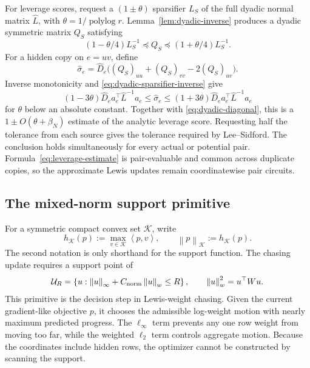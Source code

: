 \documentclass[11pt]{article}
\theoremstyle{definition}
\newcommand{\polylog}{\operatorname{polylog}}
\newcommand{\norm}[1]{\left\lVert #1\right\rVert}
\newcommand{\set}[1]{\left\{#1\right\}}
\newcommand{\ip}[2]{\left\langle #1,#2\right\rangle}
\newcommand{\defeq}{\mathrel{:=}}
\begin{document}
For leverage scores, request a $(1\pm\theta)$ sparsifier $L_S$ of the full
dyadic normal matrix $\widehat L$, with
$\theta=1/\polylog r$.  Lemma~\ref{lem:dyadic-inverse} produces a
dyadic symmetric matrix $Q_S$ satisfying
\begin{equation}\label{eq:dyadic-sparsifier-inverse}
 (1-\theta/4)L_S^{-1}\preceq Q_S
 \preceq(1+\theta/4)L_S^{-1}.
\end{equation}
For a
hidden copy on $e=uv$, define
\begin{equation}\label{eq:leverage-estimate}
 \widehat\sigma_e
   =\widehat D_e\bigl((Q_S)_{uu}+(Q_S)_{vv}
                       -2(Q_S)_{uv}\bigr).
\end{equation}
Inverse monotonicity and \eqref{eq:dyadic-sparsifier-inverse} give
\[
 (1-3\theta)\widehat D_ea_e^\top\widehat L^{-1}a_e
 \le\widehat\sigma_e\le
 (1+3\theta)\widehat D_ea_e^\top\widehat L^{-1}a_e
\]
for $\theta$ below an absolute constant.
Together with \eqref{eq:dyadic-diagonal}, this is a
$1\pm O(\theta+\beta_N)$ estimate of the analytic leverage score.  Requesting
half the tolerance from each source gives the tolerance required by
Lee--Sidford.  The conclusion holds simultaneously for every actual or
potential pair.  Formula~\eqref{eq:leverage-estimate} is pair-evaluable and
common across duplicate copies, so the approximate Lewis updates remain
coordinatewise pair circuits.

\subsection{The mixed-norm support primitive}
\label{subsec:mixed-support}

For a symmetric compact convex set $\mathcal K$, write
\[
 h_{\mathcal K}(p)\defeq\max_{v\in\mathcal K}\ip{p}{v},
 \qquad \norm{p}_{\mathcal K}\defeq h_{\mathcal K}(p).
\]
The second notation is only shorthand for the support function.  The chasing
update requires a support point of
\[
 \mathcal U_R=
 \set{u:\norm{u}_\infty+C_{\rm norm}\norm{u}_w\le R},
 \qquad \norm{u}_w^2=u^\top Wu.
\]
This primitive is the decision step in Lewis-weight chasing.  Given the
current gradient-like objective $p$, it chooses the admissible log-weight
motion with nearly maximum predicted progress.  The $\ell_\infty$ term
prevents any one row weight from moving too far, while the weighted
$\ell_2$ term controls aggregate motion.  Because the coordinates include
hidden rows, the optimizer cannot be constructed by scanning the support.
\end{document}
